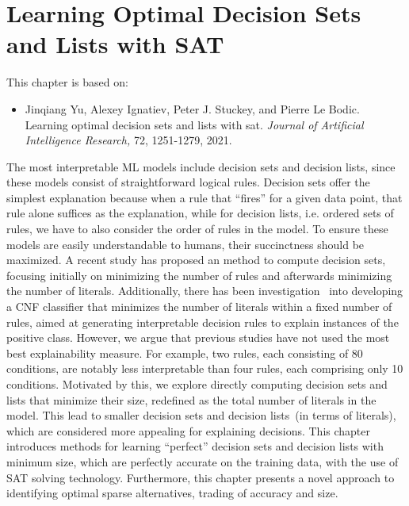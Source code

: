 \chapter{Learning Optimal Decision Sets and Lists with SAT}\label{chap:jair21}


This chapter is based on:
\begin{itemize}
	\item Jinqiang Yu, Alexey Ignatiev, Peter J. Stuckey, and Pierre Le Bodic. Learning optimal decision
sets and lists with sat. \emph{Journal of Artificial Intelligence Research,} 72, 1251-1279, 2021.
\end{itemize}

The most interpretable ML models include decision sets and decision lists,
since these models consist of straightforward logical rules.
%
Decision sets offer the simplest explanation because when a rule that ``fires'' for a given data
point, that rule alone suffices as the explanation, 
while for decision lists, i.e. ordered sets of rules, we have to also
consider the order of rules in the model.
%
To ensure these models are easily understandable to humans, 
their succinctness should be maximized.
%
A recent study has proposed an method to compute decision sets, focusing initially on minimizing the number of 
rules and afterwards minimizing the number of literals.
%
Additionally, there has been investigation~\cite{meel-cp18,meel-aies19}
into developing a CNF classifier 
that minimizes the number of literals within a fixed number of rules,
aimed at generating interpretable decision rules to explain instances of the positive class.
%
However, we argue that previous studies have not used the most best explainability measure.
%
For example, two rules, each consisting of 80 conditions, are notably less interpretable
than four rules, each comprising only 10 conditions.
%
Motivated by this, we explore directly computing decision sets and lists 
that minimize their size, redefined as the total number of literals in the model.
%
This lead to smaller decision sets and decision lists~(in terms of literals),
which are considered more appealing for explaining decisions.
%
This chapter introduces methods for learning ``perfect'' decision sets and decision lists with
minimum size, which are perfectly accurate on the training data, with the use of SAT solving technology.
%
Furthermore, this chapter presents a novel approach to identifying optimal sparse alternatives, 
trading of accuracy and size.


%
